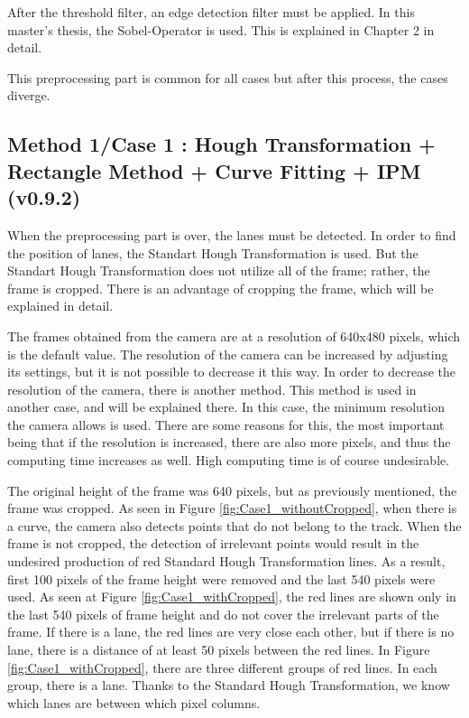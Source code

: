 After the threshold filter, an edge detection filter must be applied. In this master's thesis, the Sobel-Operator is used. This is explained in Chapter 2 in detail.
 
This preprocessing part is common for all cases but after this process, the cases diverge.
 
%
\subsection{Method 1/Case 1 : Hough Transformation + Rectangle Method + Curve Fitting + IPM (v0.9.2)}\label{sec:Case 1}

When the preprocessing part is over, the lanes must be detected. In order to find the position of lanes, the Standart Hough Transformation is used. But the Standart Hough Transformation does not utilize all of the frame; rather, the frame is cropped. There is an advantage of cropping the frame, which will be explained in detail.

The frames obtained from the camera are at a resolution of 640x480 pixels, which is the default value. The resolution of the camera can be increased by adjusting its settings, but it is not possible to decrease it this way. In order to decrease the resolution of the camera, there is another method. This method is used in another case, and will be explained there. In this case, the minimum resolution the camera allows is used. There are some reasons for this, the most important being that if the resolution is increased, there are also more pixels, and thus the computing time increases as well. High computing time is of course undesirable.
 
The original height of the frame was 640 pixels, but as previously mentioned, the frame was cropped. As seen in Figure \ref{fig:Case1_withoutCropped}, when there is a curve, the camera also detects points that do not belong to the track. When the frame is not cropped, the detection of irrelevant points would result in the undesired production of red Standard Hough Transformation lines. As a result, first 100 pixels of the frame height were removed and the last 540 pixels were used. As seen at Figure \ref{fig:Case1_withCropped}, the red lines are shown only in the last 540 pixels of frame height and do not cover the irrelevant parts of the frame. If there is a lane, the red lines are very close each other, but if there is no lane, there is a distance of at least 50 pixels between the red lines. In Figure \ref{fig:Case1_withCropped}, there are three different groups of red lines. In each group, there is a lane. Thanks to the Standard Hough Transformation, we know which lanes are between which pixel columns.


